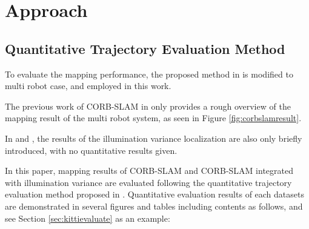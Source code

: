
\chapter{Approach}

\section{Quantitative Trajectory Evaluation Method}
To evaluate the mapping performance, the proposed method in \cite{zhang2018tutorial} is modified to multi robot case, and employed in this work.

The previous work of CORB-SLAM in \cite{li2017corb} only provides a rough overview of the mapping result of the multi robot system, as seen in Figure \ref{fig:corbslamresult}.

In \cite{maddern2014illumination} and \cite{arroyo2016openable}, the results of the illumination variance localization are also only briefly introduced, with no quantitative results given.

In this paper, mapping results of CORB-SLAM and CORB-SLAM integrated with illumination variance are evaluated following the quantitative trajectory evaluation method proposed in \cite{zhang2018tutorial}. Quantitative evaluation results of each datasets are demonstrated in several figures and tables including contents as follows, and see Section \ref{sec:kittievaluate} as an example: 

